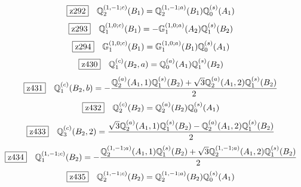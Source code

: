 \documentclass[fleqn,10pt,landscape]{jsarticle}
\begin{document}
\begin{dmath*}
\hspace*{3mm}\fbox{z292}\quad \mathbb{Q}_{2}^{(1,-1;c)}(B_{1})=\mathbb{Q}_{2}^{(1,-1;a)}(B_{1}) \mathbb{Q}_{0}^{(s)}(A_{1})
\end{dmath*}
\begin{dmath*}
\hspace*{3mm}\fbox{z293}\quad \mathbb{Q}_{1}^{(1,0;c)}(B_{1})=- \mathbb{G}_{1}^{(1,0;a)}(A_{2}) \mathbb{Q}_{1}^{(s)}(B_{2})
\end{dmath*}
\begin{dmath*}
\hspace*{3mm}\fbox{z294}\quad \mathbb{G}_{1}^{(1,0;c)}(B_{1})=\mathbb{G}_{1}^{(1,0;a)}(B_{1}) \mathbb{Q}_{0}^{(s)}(A_{1})
\end{dmath*}
\begin{dmath*}
\hspace*{3mm}\fbox{z430}\quad \mathbb{Q}_{1}^{(c)}(B_{2},a)=\mathbb{Q}_{0}^{(a)}(A_{1}) \mathbb{Q}_{1}^{(s)}(B_{2})
\end{dmath*}
\begin{dmath*}
\hspace*{3mm}\fbox{z431}\quad \mathbb{Q}_{1}^{(c)}(B_{2},b)=- \frac{\mathbb{Q}_{2}^{(a)}(A_{1},1) \mathbb{Q}_{1}^{(s)}(B_{2}) + \sqrt{3} \mathbb{Q}_{2}^{(a)}(A_{1},2) \mathbb{Q}_{1}^{(s)}(B_{2})}{2}
\end{dmath*}
\begin{dmath*}
\hspace*{3mm}\fbox{z432}\quad \mathbb{Q}_{2}^{(c)}(B_{2})=\mathbb{Q}_{2}^{(a)}(B_{2}) \mathbb{Q}_{0}^{(s)}(A_{1})
\end{dmath*}
\begin{dmath*}
\hspace*{3mm}\fbox{z433}\quad \mathbb{Q}_{3}^{(c)}(B_{2},2)=\frac{\sqrt{3} \mathbb{Q}_{2}^{(a)}(A_{1},1) \mathbb{Q}_{1}^{(s)}(B_{2}) - \mathbb{Q}_{2}^{(a)}(A_{1},2) \mathbb{Q}_{1}^{(s)}(B_{2})}{2}
\end{dmath*}
\begin{dmath*}
\hspace*{3mm}\fbox{z434}\quad \mathbb{Q}_{1}^{(1,-1;c)}(B_{2})=- \frac{\mathbb{Q}_{2}^{(1,-1;a)}(A_{1},1) \mathbb{Q}_{1}^{(s)}(B_{2}) + \sqrt{3} \mathbb{Q}_{2}^{(1,-1;a)}(A_{1},2) \mathbb{Q}_{1}^{(s)}(B_{2})}{2}
\end{dmath*}
\begin{dmath*}
\hspace*{3mm}\fbox{z435}\quad \mathbb{Q}_{2}^{(1,-1;c)}(B_{2})=\mathbb{Q}_{2}^{(1,-1;a)}(B_{2}) \mathbb{Q}_{0}^{(s)}(A_{1})
\end{dmath*}
\end{document}
